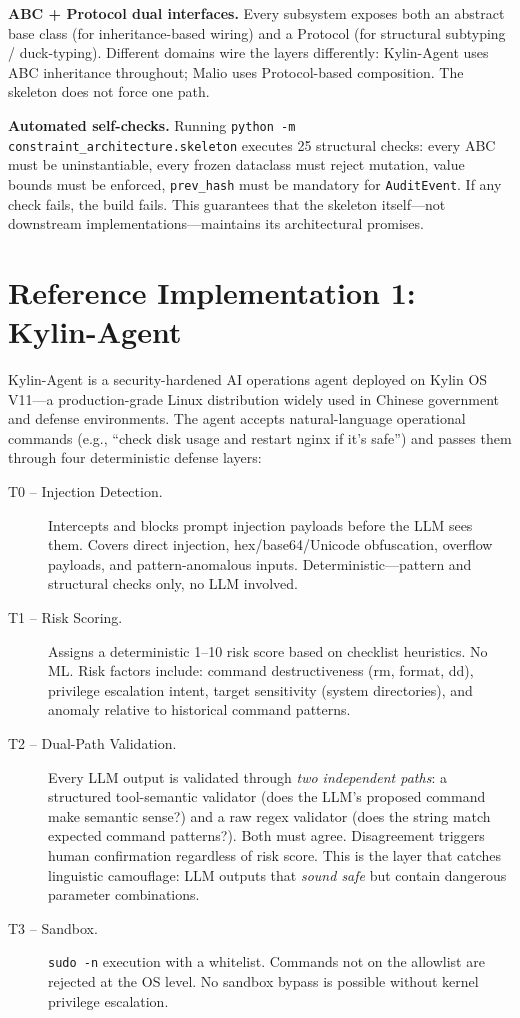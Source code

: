 \documentclass[letterpaper]{article}
\begin{document}
\textbf{ABC + Protocol dual interfaces.}  Every subsystem exposes both an
abstract base class (for inheritance-based wiring) and a Protocol (for
structural subtyping / duck-typing).  Different domains wire the layers
differently: Kylin-Agent uses ABC inheritance throughout; Malio uses
Protocol-based composition.  The skeleton does not force one path.

\textbf{Automated self-checks.}  Running \texttt{python -m
constraint\_architecture.skeleton} executes 25 structural checks: every ABC
must be uninstantiable, every frozen dataclass must reject mutation, value
bounds must be enforced, \texttt{prev\_hash} must be mandatory for
\texttt{AuditEvent}.  If any check fails, the build fails.  This guarantees
that the skeleton itself---not downstream implementations---maintains its
architectural promises.

\section{Reference Implementation 1: Kylin-Agent}

Kylin-Agent is a security-hardened AI operations agent deployed on Kylin OS
V11---a production-grade Linux distribution widely used in Chinese government
and defense environments.  The agent accepts natural-language operational
commands (e.g., ``check disk usage and restart nginx if it's safe'') and
passes them through four deterministic defense layers:

\begin{description}
\item[T0 -- Injection Detection.] Intercepts and blocks prompt injection
      payloads before the LLM sees them.  Covers direct injection,
      hex/base64/Unicode obfuscation, overflow payloads, and pattern-anomalous
      inputs.  Deterministic---pattern and structural checks only, no LLM
      involved.
\item[T1 -- Risk Scoring.] Assigns a deterministic 1--10 risk score based on
      checklist heuristics.  No ML.  Risk factors include: command
      destructiveness (rm, format, dd), privilege escalation intent,
      target sensitivity (system directories), and anomaly relative to
      historical command patterns.
\item[T2 -- Dual-Path Validation.] Every LLM output is validated through
      \textit{two independent paths}: a structured tool-semantic validator
      (does the LLM's proposed command make semantic sense?) and a raw regex
      validator (does the string match expected command patterns?).  Both
      must agree.  Disagreement triggers human confirmation regardless of
      risk score.  This is the layer that catches linguistic camouflage:
      LLM outputs that \textit{sound safe} but contain dangerous parameter
      combinations.
\item[T3 -- Sandbox.] \texttt{sudo -n} execution with a whitelist.
      Commands not on the allowlist are rejected at the OS level.
      No sandbox bypass is possible without kernel privilege escalation.
\end{description}
\end{document}
